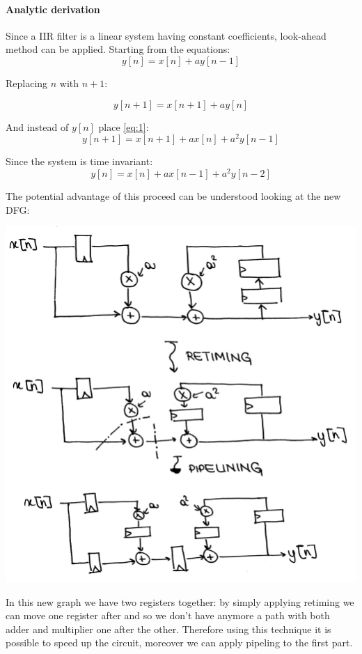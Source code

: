 \paragraph{Analytic derivation}
Since a IIR filter is a linear system having constant coefficients, look-ahead method can be applied. Starting from the equations:
\begin{equation} \label{eq:1}
y[n]=x[n]+ay[n-1]
\end{equation}

Replacing $n$ with $n+1$:

\begin{equation}
y[n+1]=x[n+1]+ay[n]
\end{equation}

And instead of $y[n]$ place \eqref{eq:1}:
\begin{equation}
y[n+1]=x[n+1]+ax[n]+a^2y[n-1]
\end{equation}

Since the system is time invariant:
\begin{equation}
y[n]=x[n]+ax[n-1]+a^2 y[n-2]
\end{equation}

The potential advantage of this proceed can be understood looking at the new DFG:
\begin{center}
  \includegraphics[width=0.7\linewidth]{img/img1/45}
\end{center}

In this new graph we have two registers together: by simply applying retiming we can move one register after and so we don't have anymore a path with both adder and multiplier one after the other. Therefore using this technique it is possible to speed up the circuit, moreover we can apply pipeling to the first part.

